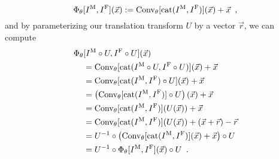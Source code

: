 \begin{equation}
	\Phi_\theta[{I^\text{M}}, {I^\text{F}}](\vec{x}) := \text{Conv}_\theta[\text{cat}({I^\text{M}}, {I^\text{F}})](\vec{x}) + \vec{x}\enspace,
\end{equation}
and by parameterizing our translation transform $U$ by a vector $\vec{r}$, we can compute
\begin{equation}
	\begin{split}
		\Phi_\theta&[{I^\text{M}}  \circ U, {I^\text{F}} \circ U](\vec{x}) \\ &= \text{Conv}_\theta[\text{cat}({I^\text{M}} \circ U, {I^\text{F}} \circ U)](\vec{x}) + \vec{x}                       \\
		&= \text{Conv}_\theta[\text{cat}({I^\text{M}}, {I^\text{F}}) \circ U](\vec{x}) + \vec{x}      \\
		&= \left(\text{Conv}_\theta[\text{cat}({I^\text{M}}, {I^\text{F}})] \circ U\right)(\vec{x}) + \vec{x}                  \\
		&= \text{Conv}_\theta[\text{cat}({I^\text{M}}, {I^\text{F}})](U(\vec{x})) + \vec{x}                         \\
		& = \text{Conv}_\theta[\text{cat}({I^\text{M}}, {I^\text{F}})](U(\vec{x})) + (\vec{x} + \vec{r}) - \vec{r}              \\
		&= U^{-1} \circ \left(\text{Conv}_\theta[\text{cat}({I^\text{M}}, {I^\text{F}})](\vec{x}) + \vec{x} \right) \circ U  \\ &= U^{-1} \circ \Phi_\theta[{I^\text{M}}, {I^\text{F}}](\vec{x}) \circ U\enspace.
	\end{split}
\end{equation}
